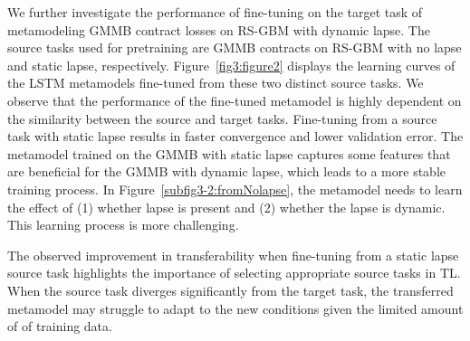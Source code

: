 We further investigate the performance of fine-tuning on the target task of metamodeling GMMB contract losses on RS-GBM with dynamic lapse. 
The source tasks used for pretraining are GMMB contracts on RS-GBM with no lapse and static lapse, respectively. 
Figure~\ref{fig3:figure2} displays the learning curves of the LSTM metamodels fine-tuned from these two distinct source tasks.
We observe that the performance of the fine-tuned metamodel is highly dependent on the similarity between the source and target tasks.
Fine-tuning from a source task with static lapse results in faster convergence and lower validation error.
The metamodel trained on the GMMB with static lapse captures some features that are beneficial for the GMMB with dynamic lapse, which leads to a more stable training process.
In Figure~\ref{subfig3-2:fromNolapse}, the metamodel needs to learn the effect of (1) whether lapse is present and (2) whether the lapse is dynamic.
This learning process is more challenging.

The observed improvement in transferability when fine-tuning from a static lapse source task highlights the importance of selecting appropriate source tasks in TL. 
When the source task diverges significantly from the target task, the transferred metamodel may struggle to adapt to the new conditions given the limited amount of of training data.

